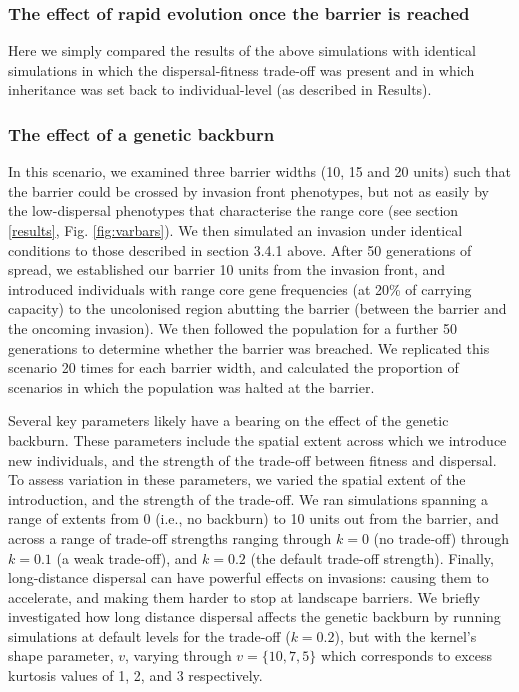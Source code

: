 \documentclass{article}
\begin{document}
\subsubsection{The effect of rapid evolution once the barrier is reached}

Here we simply compared the results of the above simulations with identical simulations in which the dispersal-fitness trade-off was present and in which inheritance was set back to individual-level (as described in Results).

\subsubsection{The effect of a genetic
backburn}

In this scenario, we examined three barrier widths (10, 15 and 20 units) such that the
barrier could be crossed by invasion front phenotypes, but not as easily by
the low-dispersal phenotypes that characterise the range core (see section
\ref{results}, Fig. \ref{fig:varbars}). We then simulated an invasion under identical conditions to those described in section 3.4.1
above. After 50 generations of spread, we established our barrier 10 units from
the invasion front, and introduced individuals with range core gene
frequencies (at 20\% of carrying capacity) to the uncolonised region
abutting the barrier (between the barrier and the oncoming invasion). We
then followed the population for a further 50 generations to determine
whether the barrier was breached. We replicated this scenario 20 times for each barrier width,
and calculated the proportion of scenarios in which the population was halted at the barrier.

Several key parameters likely have a bearing on the effect of the genetic backburn.  These parameters include the spatial extent across which we introduce new individuals, and the strength of the trade-off between fitness and dispersal.  To assess variation in these parameters, we varied the spatial extent of the introduction, and the strength of the trade-off.  We ran simulations spanning a range of
extents from 0 (i.e., no backburn) to 10 units out from the barrier, and across a range of trade-off strengths ranging through $k=0$ (no trade-off) through $k=0.1$ (a weak trade-off), and $k=0.2$ (the default trade-off strength).  Finally, long-distance dispersal can have powerful effects on invasions: causing them to accelerate, and making them harder to stop at landscape barriers.  We briefly investigated how long distance dispersal affects the genetic backburn by running simulations at default levels for the trade-off ($k=0.2$), but with the kernel's shape parameter, $v$, varying through $v=\{10, 7, 5\}$ which corresponds to excess kurtosis values of 1, 2, and 3 respectively.
\end{document}
